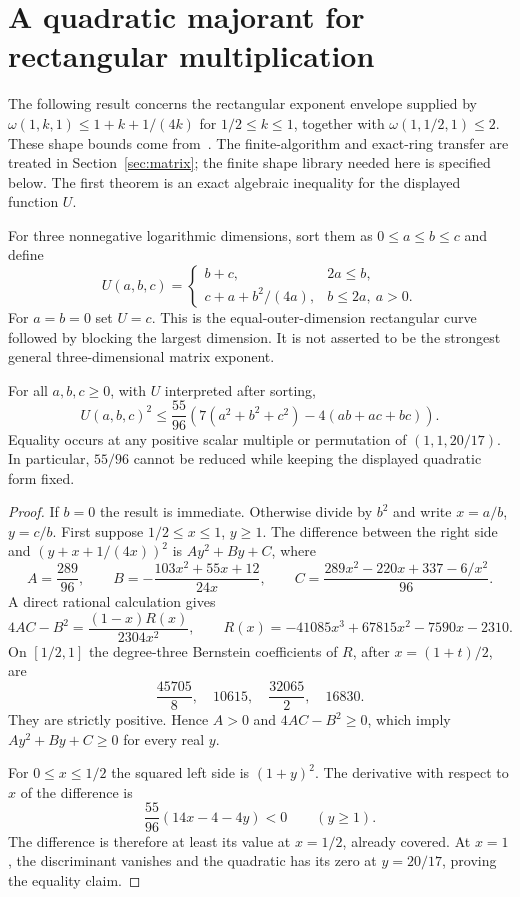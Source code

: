 \section{A quadratic majorant for rectangular multiplication}

The following result concerns the rectangular exponent envelope supplied by
$\omega(1,k,1)\le 1+k+1/(4k)$ for $1/2\le k\le1$, together with
$\omega(1,1/2,1)\le2$. These shape bounds come from~\cite{uznanski}. The finite-algorithm
and exact-ring transfer are treated in Section~\ref{sec:matrix}; the
finite shape library needed here is specified below. The first theorem
is an exact algebraic inequality for the displayed function $U$.

For three nonnegative logarithmic dimensions, sort them as $0\le a\le b\le c$
and define
\[
 U(a,b,c)=\begin{cases}
 b+c,&2a\le b,\\
 c+a+b^2/(4a),&b\le2a,\ a>0.
 \end{cases}
\]
For $a=b=0$ set $U=c$. This is the equal-outer-dimension rectangular
curve followed by blocking the largest dimension. It is not asserted to be
the strongest general three-dimensional matrix exponent.

\begin{theorem}
For all $a,b,c\ge0$, with $U$ interpreted after sorting,
\[
 U(a,b,c)^2\le \frac{55}{96}
 \left(7(a^2+b^2+c^2)-4(ab+ac+bc)\right).
\tag{Q}
\]
Equality occurs at any positive scalar multiple or permutation of
$(1,1,20/17)$. In particular, $55/96$ cannot be reduced while keeping
the displayed quadratic form fixed.
\end{theorem}
\begin{proof}
If $b=0$ the result is immediate. Otherwise divide by $b^2$ and write
$x=a/b$, $y=c/b$. First suppose $1/2\le x\le1$, $y\ge1$. The difference
between the right side and $(y+x+1/(4x))^2$ is $Ay^2+By+C$, where
\[
 A=\frac{289}{96},\qquad
 B=-\frac{103x^2+55x+12}{24x},\qquad
 C=\frac{289x^2-220x+337-6/x^2}{96}.
\]
A direct rational calculation gives
\[
 4AC-B^2=\frac{(1-x)R(x)}{2304x^2},\qquad
 R(x)=-41085x^3+67815x^2-7590x-2310.
\]
On $[1/2,1]$ the degree-three Bernstein coefficients of $R$, after
$x=(1+t)/2$, are
\[
 \frac{45705}{8},\quad10615,\quad\frac{32065}{2},\quad16830.
\]
They are strictly positive. Hence $A>0$ and $4AC-B^2\ge0$, which imply
$Ay^2+By+C\ge0$ for every real $y$.

For $0\le x\le1/2$ the squared left side is $(1+y)^2$. The derivative
with respect to $x$ of the difference is
\[
 \frac{55}{96}(14x-4-4y)<0\qquad(y\ge1).
\]
The difference is therefore at least its value at $x=1/2$, already
covered. At $x=1$, the discriminant vanishes and the quadratic has its
zero at $y=20/17$, proving the equality claim.
\end{proof}

